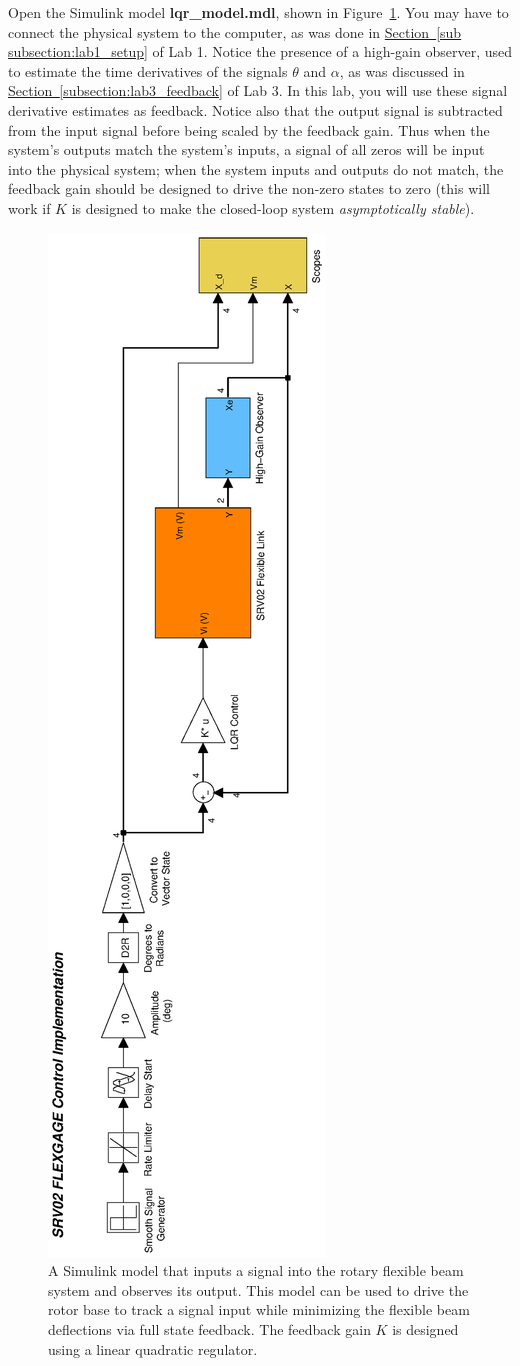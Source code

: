 \documentclass[12pt]{report}
\begin{document}
Open the Simulink model \textbf{lqr\_model.mdl}, shown in Figure~\ref{lab4_lqr_simulink}. You may have to connect the physical system to the computer, as was done in \hyperref[sub subsection:lab1_setup]{Section~\ref{sub subsection:lab1_setup}} of Lab 1. Notice the presence of a high-gain observer, used to estimate the time derivatives of the signals $\theta$ and $\alpha$, as was discussed in \hyperref[subsection:lab3_feedback]{Section~\ref{subsection:lab3_feedback}} of Lab 3. In this lab, you will use these signal derivative estimates as feedback. Notice also that the output signal is subtracted from the input signal before being scaled by the feedback gain. Thus when the system's outputs match the system's inputs, a signal of all zeros will be input into the physical system; when the system inputs and outputs do not match, the feedback gain should be designed to drive the non-zero states to zero (this will work if $K$ is designed to make the closed-loop system \emph{asymptotically stable}).
\begin{figure}[htb!]
    \includegraphics[width=0.3\linewidth,angle=-90]{eps/lab_4/lqr_simulink}
    \caption{A Simulink model that inputs a signal into the rotary flexible beam system and observes its output. This model can be used to drive the rotor base to track a signal input while minimizing the flexible beam deflections via full state feedback. The feedback gain $K$ is designed using a linear quadratic regulator.}
    \label{lab4_lqr_simulink}
\end{figure}
\end{document}
